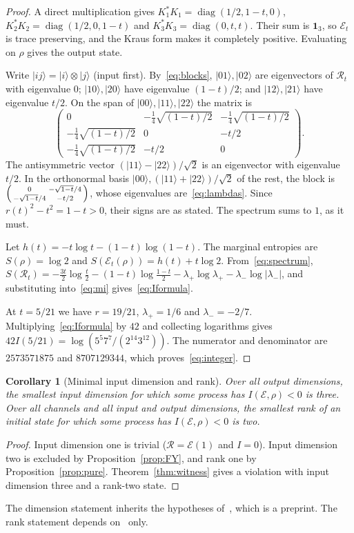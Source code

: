 \documentclass[11pt,a4paper]{article}
\newtheorem{corollary}[theorem]{Corollary}
\theoremstyle{definition}\newtheorem{definition}[theorem]{Definition}
\theoremstyle{remark}\newtheorem{remark}[theorem]{Remark}
\newcommand{\diag}{\operatorname{diag}}
\newcommand{\ket}[1]{\lvert #1\rangle}
\newcommand{\one}{\mathbf{1}}
\newcommand{\E}{\mathcal E}
\newcommand{\R}{\mathcal R}
\begin{document}
\begin{proof}
A direct multiplication gives $K_1^*K_1=\diag(1/2,1-t,0)$, $K_2^*K_2=\diag(1/2,0,1-t)$ and $K_3^*K_3=\diag(0,t,t)$. Their sum is $\one_3$, so $\E_t$ is trace preserving, and the Kraus form makes it completely positive. Evaluating on $\rho$ gives the output state.

Write $\ket{ij}=\ket i\otimes\ket j$ (input first). By~\eqref{eq:blocks}, $\ket{01},\ket{02}$ are eigenvectors of $\R_t$ with eigenvalue $0$; $\ket{10},\ket{20}$ have eigenvalue $(1-t)/2$; and $\ket{12},\ket{21}$ have eigenvalue $t/2$. On the span of $\ket{00},\ket{11},\ket{22}$ the matrix is
\begin{equation}\label{eq:threeblock}
 \begin{pmatrix}
 0&-\tfrac14\sqrt{(1-t)/2}&-\tfrac14\sqrt{(1-t)/2}\\
 -\tfrac14\sqrt{(1-t)/2}&0&-t/2\\
 -\tfrac14\sqrt{(1-t)/2}&-t/2&0
 \end{pmatrix}.
\end{equation}
The antisymmetric vector $(\ket{11}-\ket{22})/\sqrt2$ is an eigenvector with eigenvalue $t/2$. In the orthonormal basis $\ket{00},(\ket{11}+\ket{22})/\sqrt2$ of the rest, the block is
$\begin{psmallmatrix}0&-\sqrt{1-t}/4\\-\sqrt{1-t}/4&-t/2\end{psmallmatrix}$,
whose eigenvalues are~\eqref{eq:lambdas}. Since $r(t)^2-t^2=1-t>0$, their signs are as stated. The spectrum sums to $1$, as it must.

Let $h(t)=-t\log t-(1-t)\log(1-t)$. The marginal entropies are $S(\rho)=\log2$ and $S(\E_t(\rho))=h(t)+t\log2$. From~\eqref{eq:spectrum},
$S(\R_t)=-\tfrac{3t}{2}\log\tfrac t2-(1-t)\log\tfrac{1-t}2-\lambda_+\log\lambda_+-\lambda_-\log|\lambda_-|$, and substituting into~\eqref{eq:mi} gives~\eqref{eq:Iformula}.

At $t=5/21$ we have $r=19/21$, $\lambda_+=1/6$ and $\lambda_-=-2/7$. Multiplying~\eqref{eq:Iformula} by $42$ and collecting logarithms gives $42I(5/21)=\log(5^5 7^7/(2^{14}3^{12}))$. The numerator and denominator are $2573571875$ and $8707129344$, which proves~\eqref{eq:integer}.
\end{proof}

\begin{corollary}[Minimal input dimension and rank]\label{cor:minimal}
Over all output dimensions, the smallest input dimension for which some process has $I(\E,\rho)<0$ is three. Over all channels and all input and output dimensions, the smallest rank of an initial state for which some process has $I(\E,\rho)<0$ is two.
\end{corollary}
\begin{proof}
Input dimension one is trivial ($\R=\E(1)$ and $I=0$). Input dimension two is excluded by Proposition~\ref{prop:FY}, and rank one by Proposition~\ref{prop:pure}. Theorem~\ref{thm:witness} gives a violation with input dimension three and a rank-two state.
\end{proof}
The dimension statement inherits the hypotheses of~\cite[Theorem~4.1]{FY}, which is a preprint. The rank statement depends on~\cite[Lemma~4.4(iv)]{FY} only.
\end{document}
